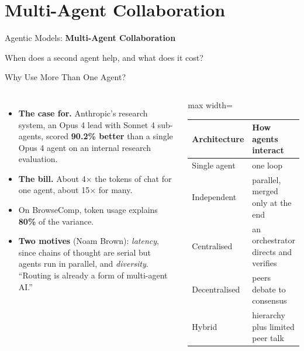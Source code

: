 \section{Multi-Agent Collaboration}

\begin{frame}{}
    \LARGE Agentic Models: \textbf{Multi-Agent Collaboration}

    \vspace{1em}
    \normalsize When does a second agent help, and what does it cost?
\end{frame}

\begin{frame}{Why Use More Than One Agent?}
    \begin{columns}[T,onlytextwidth]
        \begin{itemize}\itemsep0.45em
            \item \textbf{The case for.} Anthropic's research system, an Opus 4 lead with Sonnet 4 sub-agents, scored \textbf{90.2\% better} than a single Opus 4 agent on an internal research evaluation.
            \item \textbf{The bill.} About 4$\times$ the tokens of chat for one agent, about \alert{15$\times$} for many.
            \item On BrowseComp, token usage explains \textbf{80\%} of the variance.
            \item \textbf{Two motives} (Noam Brown): \emph{latency}, since chains of thought are serial but agents run in parallel, and \emph{diversity}. ``Routing is already a form of multi-agent AI.''
        \end{itemize}
        \centering
        \small
        \renewcommand{\arraystretch}{1.2}
        \begin{adjustbox}{max width=\linewidth}\begin{tabular}{>{\raggedright\arraybackslash}p{2.0cm}>{\raggedright\arraybackslash}p{3.9cm}}
            \toprule
            \textbf{Architecture} & \textbf{How agents interact} \\
            \midrule
            Single agent & one loop \\
            Independent & parallel, merged only at the end \\
            Centralised & an orchestrator directs and verifies \\
            Decentralised & peers debate to consensus \\
            Hybrid & hierarchy plus limited peer talk \\

\end{tabular}
\end{adjustbox}
\end{columns}
\end{frame}
